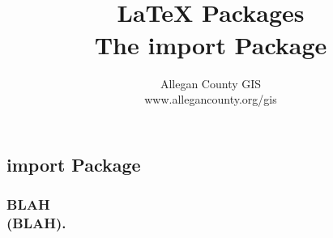 \documentclass[class=report , crop=false, multi={itemize, figure}, float=false]{standalone}
\title{ %
\HRule %
\\[.4cm] %
\Huge \bfseries \LaTeX{} Packages\\ \medskip\large The import Package %
\HRule \\[.4cm] %
}  %
\author{\Large Allegan County GIS \\\Large www.allegancounty.org/gis} %
\begin{document}

\ifstandalone
\maketitle %
\tableofcontents %
\clearpage
\fi


\subsection{import Package}
	\medskip 
	\subsubsection{\Large BLAH \\\small(BLAH).}	
	

\end{document}
